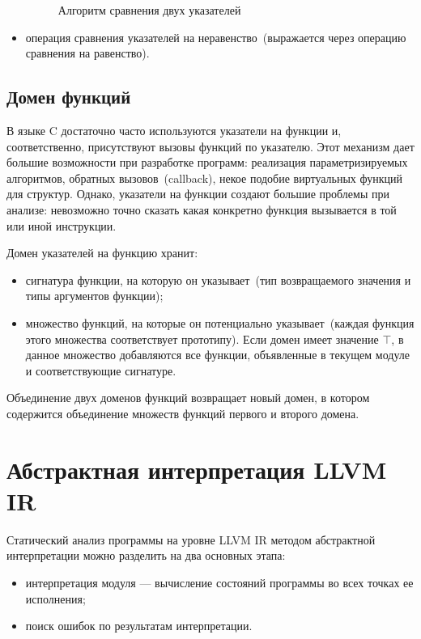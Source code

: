 \begin{itemize}
\begin{figure}[h!]
\begin{algorithmic}[1]
\end{algorithmic}
\caption{Алгоритм сравнения двух указателей}
\label{image:ptrEq}
\end{figure}

\item операция сравнения указателей на неравенство~(выражается через операцию
сравнения на равенство).
\end{itemize}

\subsection{Домен функций}
В языке C достаточно часто используются указатели на функции и, соответственно,
присутствуют вызовы функций по указателю. Этот механизм дает большие 
возможности при разработке программ: реализация параметризируемых алгоритмов, 
обратных вызовов~(callback), некое подобие виртуальных функций для структур. 
Однако, указатели на функции создают большие проблемы при анализе: невозможно 
точно сказать какая конкретно функция вызывается в той или иной инструкции.

Домен указателей на функцию хранит:
\begin{itemize}
\item сигнатура функции, на которую он указывает~(тип возвращаемого значения
и типы аргументов функции);
\item множество функций, на которые он потенциально указывает~(каждая функция
этого множества соответствует прототипу). Если домен имеет значение $\top$, в
данное множество добавляются все функции, объявленные в текущем модуле и 
соответствующие сигнатуре.
\end{itemize}

Объединение двух доменов функций возвращает новый домен, в котором содержится
объединение множеств функций первого и второго домена.

\section{Абстрактная интерпретация LLVM IR}
Статический анализ программы на уровне LLVM IR методом абстрактной 
интерпретации можно разделить на два основных этапа:
\begin{itemize}
\item интерпретация модуля --- вычисление состояний программы во всех точках
ее исполнения;
\item поиск ошибок по результатам интерпретации.
\end{itemize}

